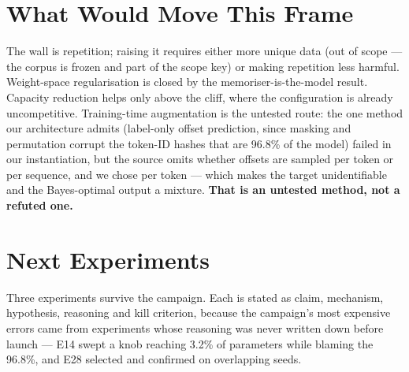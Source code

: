 \documentclass{article}
\begin{document}
\section{What Would Move This Frame}
The wall is repetition; raising it requires either more unique data (out of scope --- the corpus is frozen and part of the scope key) or making repetition less harmful. Weight-space regularisation is closed by the memoriser-is-the-model result. Capacity reduction helps only above the cliff, where the configuration is already uncompetitive. Training-time augmentation is the untested route: the one method our architecture admits (label-only offset prediction, since masking and permutation corrupt the token-ID hashes that are 96.8\% of the model) failed in our instantiation, but the source omits whether offsets are sampled per token or per sequence, and we chose per token --- which makes the target unidentifiable and the Bayes-optimal output a mixture. \textbf{That is an untested method, not a refuted one.}

\section{Next Experiments}
Three experiments survive the campaign. Each is stated as claim, mechanism, hypothesis, reasoning and kill criterion, because the campaign's most expensive errors came from experiments whose reasoning was never written down before launch --- E14 swept a knob reaching 3.2\% of parameters while blaming the 96.8\%, and E28 selected and confirmed on overlapping seeds.
\end{document}
